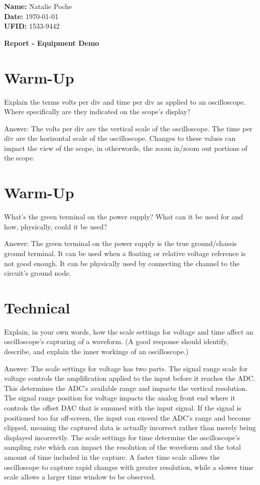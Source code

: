 \documentclass{article}
\begin{document}
\noindent \textbf{Name:} Natalie Poche\\
\textbf{Date:} \today \\ %
\textbf{UFID:} 1533-9442

\begin{center} %
    \large\textbf{Report - Equipment Demo}
\end{center}

\section{Warm-Up}
Explain the terms volts per div and time per div as applied to an oscilloscope. Where specifically are they indicated on the scope’s display?

Answer: The volts per div are the vertical scale of the oscilloscope. The time per div are the horizontal scale of the oscilloscope. Changes to these values can impact the view of the scope, in otherwords, the zoom in/zoom out portions of the scope.

\section{Warm-Up}
What’s the green terminal on the power supply? What can it be used for and how, physically, could it be used?

Answer: The green terminal on the power supply is the true ground/chassis ground terminal. It can be used when a floating or relative voltage reference is not good enough. It can be physically used by connecting the channel to the circuit's ground node.

\section{Technical}
Explain, in your own words, how the scale settings for voltage and time affect an oscilloscope’s capturing of a waveform. (A good response should identify, describe, and explain the inner workings of an oscilloscope.)

Answer: The scale settings for voltage has two parts. The signal range scale for voltage controls the amplification applied to the input before it reaches the ADC. This determines the ADC's available range and impacts the vertical resolution. The signal range position for voltage impacts the analog front end where it controls the offset DAC that is summed with the input signal. If the signal is positioned too far off-screen, the input can exceed the ADC's range and become clipped, meaning the captured data is actually incorrect rather than merely being displayed incorrectly. The scale settings for time determine the oscilloscope's sampling rate which can impact the resolution of the waveform and the total amount of time included in the capture. A faster time scale allows the oscilloscope to capture rapid changes with greater resolution, while a slower time scale allows a larger time window to be observed.
\end{document}
